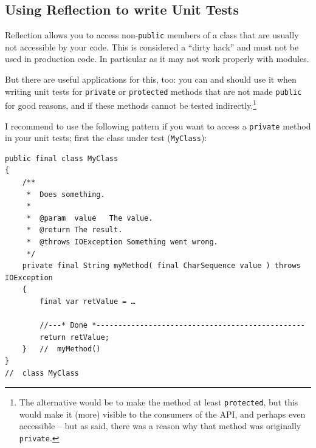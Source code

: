 
\subsection{Using Reflection to write Unit Tests}
Reflection allows you to access non-\lstinline|public| members of a class that are usually not accessible by your code. This is considered a “dirty hack” and must not be used in production code. In particular as it may not work properly with modules.

But there are useful applications for this, too: you can and should use it when writing unit tests for \lstinline|private| or \lstinline|protected| methods that are not made \lstinline|public| for good reasons, and if these methods cannot be tested indirectly.\footnote{The alternative would be to make the method at least \lstinline|protected|, but this would make it (more) visible to the consumers of the API, and perhaps even accessible – but as said, there was a reason why that method was originally \lstinline|private|.}

I recommend to use the following pattern if you want to access a \lstinline|private| method in your unit tests; first the class under test (\lstinline|MyClass|):
\begin{lstlisting}
public final class MyClass
{
    /**
     *  Does something.
     *
     *  @param  value   The value.
     *  @return The result.
     *  @throws IOException Something went wrong.
     */
    private final String myMethod( final CharSequence value ) throws IOException
    { 
        final var retValue = … 
        
        //---* Done *------------------------------------------------
        return retValue;
    }   //  myMethod()
}   
//  class MyClass
\end{lstlisting}

